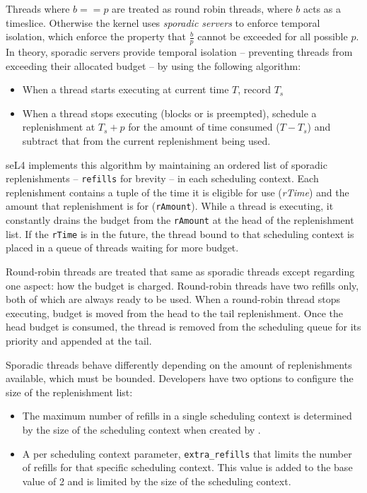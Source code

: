 Threads where $b == p$ are treated as round robin threads, where $b$ acts as a timeslice.
Otherwise the kernel uses \emph{sporadic servers} to enforce temporal isolation, which enforce the
property that $\frac{b}{p}$ cannot be exceeded for all possible $p$.
In theory, sporadic servers provide temporal isolation -- preventing threads from exceeding their allocated budget -- by using the following algorithm:

\begin{itemize}
\item When a thread starts executing at current time $T$, record $T_{s}$
\item When a thread stops executing (blocks or is preempted), schedule a replenishment at $T_{s} + p$ for the
amount of time consumed ($T - T_{s}$) and subtract that from the current replenishment being used.
\end{itemize}

seL4 implements this algorithm by maintaining an ordered list of sporadic replenishments --
\texttt{refills} for brevity -- in each scheduling context. Each replenishment contains a tuple
of the time it is eligible for use (\emph{rTime}) and the amount that replenishment is for
(\texttt{rAmount}).
While a thread is executing, it constantly drains the budget from the \texttt{rAmount} at the head of the
replenishment list. If the \texttt{rTime} is in the future, the thread bound to that
scheduling context is placed in a queue of threads waiting for more budget.

Round-robin threads are treated that same as sporadic threads except regarding one aspect: how the
budget is charged. Round-robin threads have two refills only, both of which are always ready to be
used. When a round-robin thread stops executing, budget is moved from the head to the tail
replenishment. Once the head budget is consumed, the thread is removed from the scheduling queue
for its priority and appended at the tail.

Sporadic threads behave differently depending on the amount of replenishments available, which
must be bounded. Developers have two options to configure the size of the replenishment list:

\begin{itemize}
\item The maximum number of refills in a single scheduling context is determined by the size
      of the scheduling context when created by .
\item A per scheduling context parameter, \texttt{extra\_refills} that
limits the number of refills for that specific scheduling context. This value is added to the base
value of 2 and is limited by the size of the scheduling context.
\end{itemize}

